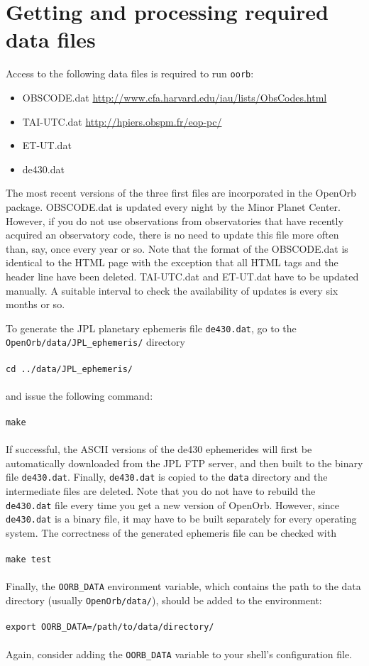 \documentclass[12pt,english,twoside,a4paper]{report}
\begin{document}
\section{Getting and processing required data files}

Access to the following data files is required to run \verb|oorb|: 
\begin{itemize}
  \item OBSCODE.dat \href{http://www.cfa.harvard.edu/iau/lists/ObsCodes.html}{http://www.cfa.harvard.edu/iau/lists/ObsCodes.html}
  \item TAI-UTC.dat \href{http://hpiers.obspm.fr/eop-pc/}{http://hpiers.obspm.fr/eop-pc/}
  \item ET-UT.dat \href{}{}
  \item de430.dat
\end{itemize}
The most recent versions of the three first files are incorporated in
the OpenOrb package. OBSCODE.dat is updated every night by the Minor
Planet Center. However, if you do not use observations from
observatories that have recently acquired an observatory code, there
is no need to update this file more often than, say, once every year
or so. Note that the format of the OBSCODE.dat is identical to the
HTML page with the exception that all HTML tags and the header line
have been deleted. TAI-UTC.dat and ET-UT.dat have to be updated
manually. A suitable interval to check the availability of updates is
every six months or so.

To generate the JPL planetary ephemeris file \verb|de430.dat|, go to
the \\ \verb|OpenOrb/data/JPL_ephemeris/| directory \\ \\ 
\verb|cd ../data/JPL_ephemeris/| \\ \\ 
and issue the following command: \\ \\ 
\verb|make| \\ \\
If successful, the ASCII versions of the de430 ephemerides will first
be automatically downloaded from the JPL FTP server, and then built to
the binary file \verb|de430.dat|. Finally, \verb|de430.dat| is copied
to the \verb|data| directory and the intermediate files are
deleted. Note that you do not have to rebuild the \verb|de430.dat|
file every time you get a new version of OpenOrb. However, since
\verb|de430.dat| is a binary file, it may have to be built separately
for every operating system. The correctness of the generated ephemeris
file can be checked with \\ \\
\verb|make test| \\ \\
Finally, the \verb|OORB_DATA| environment variable, which contains the
path to the data directory (usually \verb|OpenOrb/data/|), should be
added to the environment: \\ \\
\verb|export OORB_DATA=/path/to/data/directory/| \\ \\
Again, consider adding the \verb|OORB_DATA| variable to your shell's
configuration file. 
\end{document}
